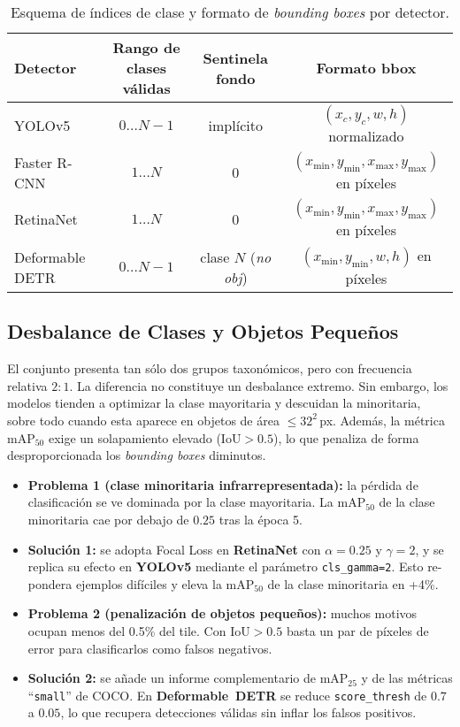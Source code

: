 \begin{table}[!h]
\centering
\caption{Esquema de índices de clase y formato de \emph{bounding boxes} por detector.}
\label{tab:label_schemes}
\begin{tabular}{|l|c|c|c|}
\hline
\textbf{Detector} & \textbf{Rango de clases válidas} & \textbf{Sentinela fondo} & \textbf{Formato bbox} \\ \hline
YOLOv5            & $0\dots N{-}1$                   & implícito                & $(x_c,y_c,w,h)$ normalizado \\ \hline
Faster R-CNN      & $1\dots N$                       & 0                        & $(x_{\min},y_{\min},x_{\max},y_{\max})$ en píxeles \\ \hline
RetinaNet         & $1\dots N$                       & 0                        & $(x_{\min},y_{\min},x_{\max},y_{\max})$ en píxeles \\ \hline
Deformable DETR   & $0\dots N{-}1$                   & clase $N$ (\textit{no obj}) & $(x_{\min},y_{\min},w,h)$ en píxeles \\ \hline
\end{tabular}
\end{table}


\subsection{Desbalance de Clases y Objetos Pequeños}\label{ssec:small_obj}

El conjunto presenta tan sólo dos grupos taxonómicos, pero con frecuencia relativa \(2{:}1\).
La diferencia no constituye un desbalance extremo.
Sin embargo, los modelos tienden a optimizar la clase mayoritaria y descuidan la minoritaria, sobre todo cuando esta aparece en objetos de área \(\le 32^2\)\,px.
Además, la métrica \(\text{mAP}_{50}\) exige un solapamiento elevado (\(\text{IoU}>0.5\)), lo que penaliza de forma desproporcionada los \emph{bounding boxes} diminutos.

\begin{itemize}
   \item \textbf{Problema 1 (clase minoritaria infrarrepresentada):} la pérdida de clasificación se ve dominada por la clase mayoritaria.
   La \(\text{mAP}_{50}\) de la clase minoritaria cae por debajo de \(0.25\) tras la época 5.
   \item \textbf{Solución 1:} se adopta Focal Loss en \textbf{RetinaNet} con \(\alpha=0.25\) y \(\gamma=2\), y se replica su efecto en \textbf{YOLOv5} mediante el parámetro \texttt{cls\_gamma=2}.
   Esto re-pondera ejemplos difíciles y eleva la \(\text{mAP}_{50}\) de la clase minoritaria en +4\%.
   \item \textbf{Problema 2 (penalización de objetos pequeños):} muchos motivos ocupan menos del 0.5\% del tile.
   Con \(\text{IoU}>0.5\) basta un par de píxeles de error para clasificarlos como falsos negativos.
   \item \textbf{Solución 2:} se añade un informe complementario de \(\text{mAP}_{25}\) y de las métricas “\texttt{small}” de COCO.
   En \textbf{Deformable~DETR} se reduce \texttt{score\_thresh} de \(0.7\) a \(0.05\), lo que recupera detecciones válidas sin inflar los falsos positivos.
\end{itemize}


